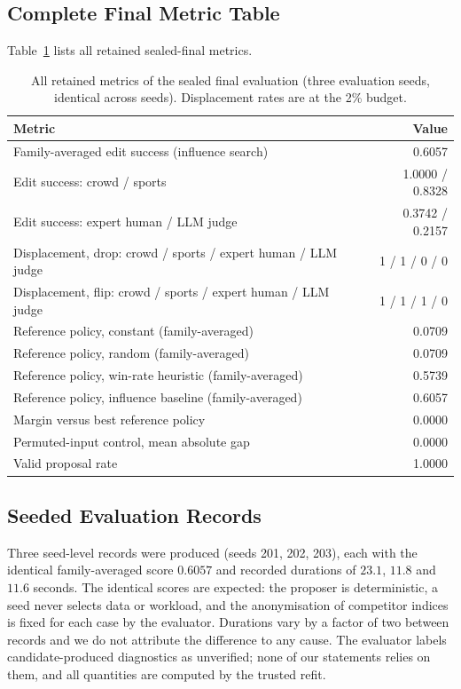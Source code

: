 \documentclass{article}
\begin{document}
\subsection{Complete Final Metric Table}
\label{app:metrics}
Table~\ref{tab:allmetrics} lists all retained sealed-final metrics.
\begin{table}[h]
\centering
\caption{All retained metrics of the sealed final evaluation (three evaluation seeds, identical across seeds). Displacement rates are at the 2\% budget.}
\label{tab:allmetrics}
\small
\begin{tabular}{lr}
\toprule
Metric & Value \\
\midrule
Family-averaged edit success (influence search) & 0.6057 \\ %
Edit success: crowd / sports & 1.0000 / 0.8328 \\
Edit success: expert human / LLM judge & 0.3742 / 0.2157 \\ %
Displacement, drop: crowd / sports / expert human / LLM judge & 1 / 1 / 0 / 0 \\
Displacement, flip: crowd / sports / expert human / LLM judge & 1 / 1 / 1 / 0 \\
Reference policy, constant (family-averaged) & 0.0709 \\
Reference policy, random (family-averaged) & 0.0709 \\
Reference policy, win-rate heuristic (family-averaged) & 0.5739 \\
Reference policy, influence baseline (family-averaged) & 0.6057 \\
Margin versus best reference policy & 0.0000 \\
Permuted-input control, mean absolute gap & 0.0000 \\
Valid proposal rate & 1.0000 \\
\bottomrule
\end{tabular}
\end{table}

\subsection{Seeded Evaluation Records}
\label{app:seeds}
Three seed-level records were produced (seeds 201, 202, 203), each with the identical family-averaged score $0.6057$ and recorded durations of $23.1$, $11.8$ and $11.6$ seconds. %
The identical scores are expected: the proposer is deterministic, a seed never selects data or workload, and the anonymisation of competitor indices is fixed for each case by the evaluator. Durations vary by a factor of two between records and we do not attribute the difference to any cause. The evaluator labels candidate-produced diagnostics as unverified; none of our statements relies on them, and all quantities are computed by the trusted refit.
\end{document}

